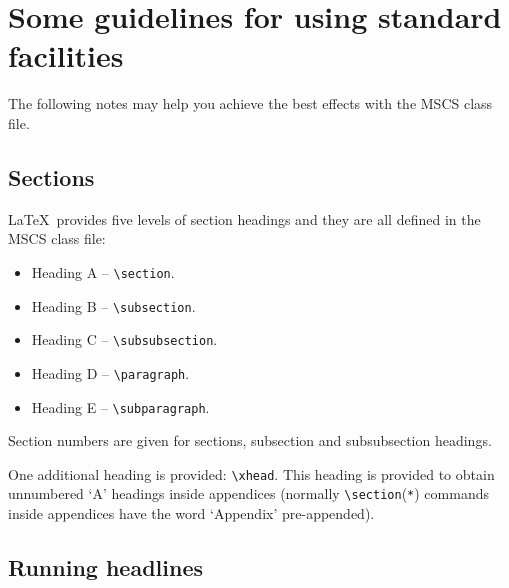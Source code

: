 \documentclass{mscs}
\begin{document}
\section{Some guidelines for using standard facilities}

The following notes may help you achieve the best effects with the MSCS
class file.

\subsection{Sections}

\LaTeX\ provides five levels of section headings and they are all
defined in the MSCS class file:
\begin{itemize}
  \item Heading A -- \verb"\section".
  \item Heading B -- \verb"\subsection".
  \item Heading C -- \verb"\subsubsection".
  \item Heading D -- \verb"\paragraph".
  \item Heading E -- \verb"\subparagraph".
\end{itemize}
Section numbers are given for sections, subsection and subsubsection
headings.

One additional heading is provided: \verb"\xhead". This
heading is provided to obtain unnumbered `A' headings inside appendices
(normally \verb"\section"(\verb"*") commands inside appendices have the word
`Appendix' pre-appended).

\subsection{Running headlines}
\end{document}
